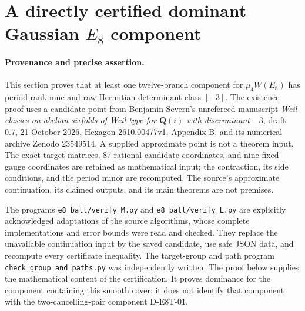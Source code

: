 \section{A directly certified dominant Gaussian $E_8$ component}
\label{sec:im-e8-period}

\paragraph{Provenance and precise assertion.}
This section proves that at least one twelve-branch component for
$\mu_4W(E_8)$ has period rank nine and raw Hermitian determinant
class $[-3]$. The existence proof uses a candidate point from Benjamin
Severn's unrefereed manuscript
\emph{Weil classes on abelian sixfolds of Weil type for
$\mathbf Q(i)$ with discriminant $-3$}, draft 0.7, 21 October 2026,
Hexagon 2610.00477v1, Appendix B, and its numerical archive
Zenodo 23549514. A supplied approximate point is not a theorem input.
The exact target matrices, 87 rational candidate coordinates, and
nine fixed gauge coordinates are retained as mathematical input;
the contraction, its side conditions, and the period minor are
recomputed. The source's approximate continuation, its claimed
outputs, and its main theorems are not premises.

The programs \texttt{e8\_ball/verify\_M.py} and
\texttt{e8\_ball/verify\_L.py} are explicitly acknowledged adaptations
of the source algorithms, whose complete implementations and error
bounds were read and checked. They replace the unavailable continuation
input by the saved candidate, use safe JSON data, and recompute every
certificate inequality. The target-group and path program
\texttt{check\_group\_and\_paths.py} was independently written.
The proof below supplies the mathematical content of the certification.
It proves dominance for the component containing this smooth cover;
it does not identify that component with the two-cancelling-pair
component D-E8T-01.


